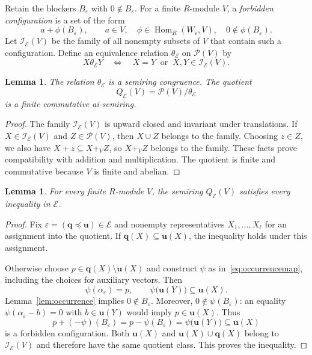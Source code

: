 \documentclass[10pt,a4paper]{amsart}
\newtheorem{lemma}[theorem]{Lemma}
\numberwithin{equation}{section}
\newcommand{\Pow}{\mathcal{P}}
\newcommand{\Hom}{\operatorname{Hom}}
\newcommand{\bu}{\mathbf{u}}
\newcommand{\bq}{\mathbf{q}}
\newcommand{\calI}{\mathcal{I}}
\newcommand{\calE}{\mathcal{E}}
\begin{document}
Retain the blockers $B_\varepsilon$ with $0\notin B_\varepsilon$. For a finite $R$-module $V$, a \emph{forbidden configuration} is a set of the form
\begin{equation}\label{eq:forbidden}
 a+\phi(B_\varepsilon),\qquad
 a\in V,\quad\phi\in\Hom_R(W_\varepsilon,V),\quad
 0\notin\phi(B_\varepsilon).
\end{equation}
Let $\calI_{\calE}(V)$ be the family of all nonempty subsets of $V$ that contain such a configuration. Define an equivalence relation $\theta_{\calE}$ on $\Pow(V)$ by
\[
 X\mathrel{\theta_{\calE}}Y
 \quad\Longleftrightarrow\quad
 X=Y\ \text{ or }\ X,Y\in\calI_{\calE}(V).
\]

\begin{lemma}\label{lem:congruence}
The relation $\theta_{\calE}$ is a semiring congruence. The quotient
\[
 Q_{\calE}(V)=\Pow(V)/\theta_{\calE}
\]
is a finite commutative ai-semiring.
\end{lemma}
\begin{proof}
The family $\calI_{\calE}(V)$ is upward closed and invariant under translations. If $X\in\calI_{\calE}(V)$ and $Z\in\Pow(V)$, then $X\cup Z$ belongs to the family. Choosing $z\in Z$, we also have $X+z\subseteq X+_V Z$, so $X+_V Z$ belongs to the family. These facts prove compatibility with addition and multiplication. The quotient is finite and commutative because $V$ is finite and abelian.
\end{proof}

\begin{lemma}\label{lem:fragmentmodel}
For every finite $R$-module $V$, the semiring $Q_{\calE}(V)$ satisfies every inequality in $\calE$.
\end{lemma}
\begin{proof}
Fix $\varepsilon=(\bq\preceq\bu)\in\calE$ and nonempty representatives $X_1,\ldots,X_\ell$ for an assignment into the quotient. If $\bq(X)\subseteq\bu(X)$, the inequality holds under this assignment.

Otherwise choose $p\in\bq(X)\setminus\bu(X)$ and construct $\psi$ as in~\eqref{eq:occurrencemap}, including the choices for auxiliary vectors. Then
\[
 \psi(\alpha_\varepsilon)=p,\qquad
 \psi\bigl(\bu(Y)\bigr)\subseteq\bu(X).
\]
Lemma~\ref{lem:occurrence} implies $0\notin B_\varepsilon$. Moreover, $0\notin\psi(B_\varepsilon)$: an equality $\psi(\alpha_\varepsilon-b)=0$ with $b\in\bu(Y)$ would imply $p\in\bu(X)$. Thus
\begin{equation}\label{eq:forcing}
 p+(-\psi)(B_\varepsilon)
 =p-\psi(B_\varepsilon)
 =\psi\bigl(\bu(Y)\bigr)\subseteq\bu(X)
\end{equation}
is a forbidden configuration. Both $\bu(X)$ and $\bu(X)\cup\bq(X)$ belong to $\calI_{\calE}(V)$ and therefore have the same quotient class. This proves the inequality.
\end{proof}
\end{document}
